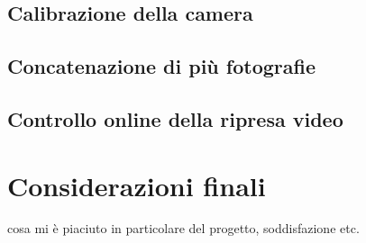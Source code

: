 \documentclass[twoside]{supsistudent}
\begin{document}
\subsection{Calibrazione della camera}

\subsection{Concatenazione di più fotografie}

\subsection{Controllo online della ripresa video}

\section{Considerazioni finali}
cosa mi è piaciuto in particolare del progetto, soddisfazione etc.

\nocite{*}

\end{document}
